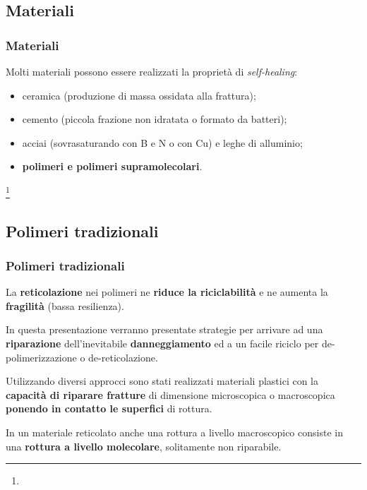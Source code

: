 \subsection{Materiali}\begin{frame}\frametitle{Materiali}
    Molti materiali possono essere realizzati la proprietà di \emph{self-healing}:
\begin{itemize}
 \item ceramica (produzione di massa ossidata alla frattura);\pause
 \item cemento (piccola frazione non idratata o  formato da batteri);\pause
 \item acciai (sovrasaturando con B e N o con Cu) e leghe di alluminio;\pause
 \item \textbf{polimeri e polimeri supramolecolari}.
\end{itemize}

\footnote{\tiny  {}}



\end{frame}




\subsection{Polimeri tradizionali}\begin{frame}\frametitle{Polimeri tradizionali}
La \textbf{reticolazione} nei polimeri ne \textbf{riduce la riciclabilità} e ne aumenta la \textbf{fragilità} (bassa resilienza).

In questa presentazione verranno presentate strategie per arrivare ad una \textbf{riparazione} dell'inevitabile \textbf{danneggiamento} ed a un facile riciclo per de-polimerizzazione o de-reticolazione.

\vspace{10pt}

Utilizzando diversi approcci sono stati realizzati materiali plastici con la \textbf{capacità di riparare fratture} di dimensione microscopica o macroscopica \textbf{ponendo in contatto le superfici} di rottura.

\vspace{10pt}

In un materiale reticolato anche una rottura a livello macroscopico consiste in una \textbf{rottura a livello molecolare}, solitamente non riparabile.

\end{frame}
